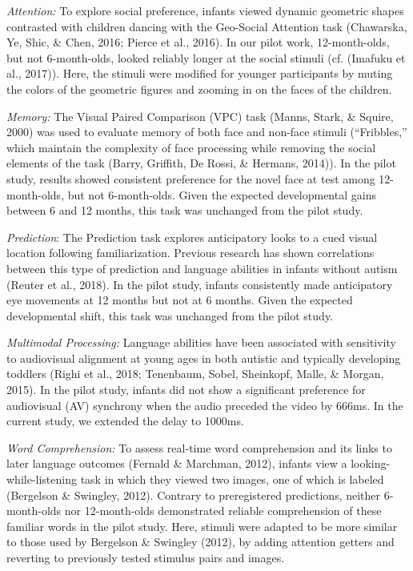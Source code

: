 \documentclass[
  english,
  man,floatsintext]{apa6}
\begin{document}
\emph{Attention:} To explore social preference, infants viewed dynamic geometric shapes contrasted with children dancing with the Geo-Social Attention task (Chawarska, Ye, Shic, \& Chen, 2016; Pierce et al., 2016).
In our pilot work, 12-month-olds, but not 6-month-olds, looked reliably longer at the social stimuli (cf. (Imafuku et al., 2017)).
Here, the stimuli were modified for younger participants by muting the colors of the geometric figures and zooming in on the faces of the children.

\emph{Memory:} The Visual Paired Comparison (VPC) task (Manns, Stark, \& Squire, 2000) was used to evaluate memory of both face and non-face stimuli (``Fribbles,'' which maintain the complexity of face processing while removing the social elements of the task (Barry, Griffith, De Rossi, \& Hermans, 2014)).
In the pilot study, results showed consistent preference for the novel face at test among 12-month-olds, but not 6-month-olds.
Given the expected developmental gains between 6 and 12 months, this task was unchanged from the pilot study.

\emph{Prediction}: The Prediction task explores anticipatory looks to a cued visual location following familiarization.
Previous research has shown correlations between this type of prediction and language abilities in infants without autism (Reuter et al., 2018).
In the pilot study, infants consistently made anticipatory eye movements at 12 months but not at 6 months.
Given the expected developmental shift, this task was unchanged from the pilot study.

\emph{Multimodal Processing:} Language abilities have been associated with sensitivity to audiovisual alignment at young ages in both autistic and typically developing toddlers (Righi et al., 2018; Tenenbaum, Sobel, Sheinkopf, Malle, \& Morgan, 2015).
In the pilot study, infants did not show a significant preference for audiovisual (AV) synchrony when the audio preceded the video by 666ms.
In the current study, we extended the delay to 1000ms.

\emph{Word Comprehension:} To assess real-time word comprehension and its links to later language outcomes (Fernald \& Marchman, 2012), infants view a looking-while-listening task in which they viewed two images, one of which is labeled (Bergelson \& Swingley, 2012).
Contrary to preregistered predictions, neither 6-month-olds nor 12-month-olds demonstrated reliable comprehension of these familiar words in the pilot study.
Here, stimuli were adapted to be more similar to those used by Bergelson \& Swingley (2012), by adding attention getters and reverting to previously tested stimulus pairs and images.
\end{document}

